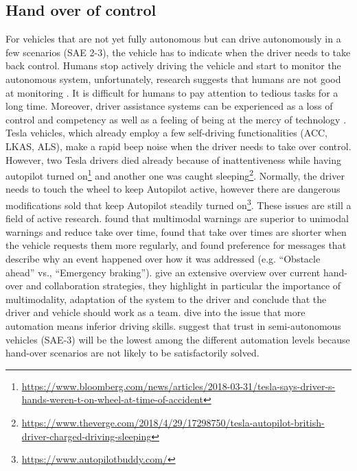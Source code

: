 \subsection{Hand over of control}
For vehicles that are not yet fully autonomous but can drive autonomously in a few scenarios (SAE 2-3), the vehicle has to indicate when the driver needs to take back control. Humans stop actively driving the vehicle and start to monitor the autonomous system, unfortunately, research suggests that humans are not good at monitoring \citep{Naujoks2014TheConditions.}. It is difficult for humans to pay attention to tedious tasks for a long time. Moreover, driver assistance systems can be experienced as a loss of control and competency as well as a feeling of being at the mercy of technology \citep{Eckoldt2012AnSystems}. Tesla vehicles, which already employ a few self-driving functionalities (ACC, LKAS, ALS), make a rapid beep noise when the driver needs to take over control. However, two Tesla drivers died already because of inattentiveness while having autopilot turned on\footnote{\url{https://www.bloomberg.com/news/articles/2018-03-31/tesla-says-driver-s-hands-weren-t-on-wheel-at-time-of-accident}} and another one was caught sleeping\footnote{\url{https://www.theverge.com/2018/4/29/17298750/tesla-autopilot-british-driver-charged-driving-sleeping}}. Normally, the driver needs to touch the wheel to keep Autopilot active, however there are dangerous modifications sold that keep Autopilot steadily turned on\footnote{\url{https://www.autopilotbuddy.com/}}. These issues are still a field of active research. \citet{Politis} found that multimodal warnings are superior to unimodal warnings and reduce take over time, \citet{Merat2014TransitionVehicle} found that take over times are shorter when the vehicle requests them more regularly, and \citet{Koo2015} found preference for messages that describe why an event happened over how it was addressed (e.g. “Obstacle ahead” vs., “Emergency braking”).  \citet{Walch2017} give an extensive overview over current hand-over and collaboration strategies, they highlight in particular the importance of multimodality, adaptation of the system to the driver and conclude that the driver and vehicle should work as a team. \citet{Meschtscherjakova} dive into the issue that more automation means inferior driving skills. \citet{Rodel} suggest that trust in semi-autonomous vehicles (SAE-3) will be the lowest among the different automation levels because hand-over scenarios are not likely to be satisfactorily solved. 



